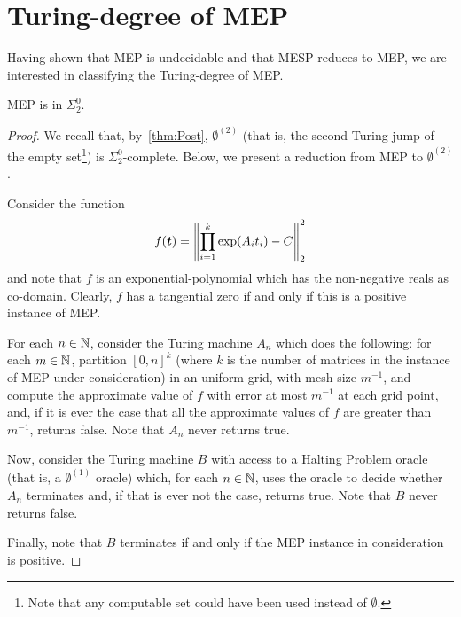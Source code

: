 \section{Turing-degree of MEP}
\label{sec:turing-degree-lics}

Having shown that MEP is undecidable and that MESP reduces to MEP, we are interested in classifying the Turing-degree of MEP.




\begin{theorem}
\label{thm:turing-degree-2}
  MEP is in $\Sigma_{2}^{0}$.
\end{theorem}

\begin{proof}
  We recall that, by~\cref{thm:Post}, $\emptyset^{(2)}$ (that is, the second Turing jump of the empty set\footnote{Note that any computable set could have been used instead of $\emptyset$.}) is $\Sigma_{2}^{0}$-complete. Below, we present a reduction from MEP to $\emptyset^{(2)}$.

  Consider the function
  \begin{equation*}
    f(\boldsymbol{t}) = \left\| \prod \limits_{i=1}^{k} \exp(A_{i} t_{i}) - C \right\|_{2}^{2}
  \end{equation*}
  and note that $f$ is an exponential-polynomial which has the non-negative reals as co-domain. Clearly, $f$ has a tangential zero if and only if this is a positive instance of MEP.

  For each $n \in \mathbb{N}$, consider the Turing machine $A_{n}$ which does the following: for each $m \in \mathbb{N}$, partition $[0,n]^{k}$ (where $k$ is the number of matrices in the instance of MEP under consideration) in an uniform grid, with mesh size $m^{-1}$, and compute the approximate value of $f$ with error at most $m^{-1}$ at each grid point, and, if it is ever the case that all the approximate values of $f$ are greater than $m^{-1}$, returns false. Note that $A_{n}$ never returns true.

  Now, consider the Turing machine $B$ with access to a Halting Problem oracle (that is, a $\emptyset^{(1)}$ oracle) which, for each $n \in \mathbb{N}$, uses the oracle to decide whether $A_{n}$ terminates and, if that is ever not the case, returns true. Note that $B$ never returns false.

  Finally, note that $B$ terminates if and only if the MEP instance in consideration is positive.
\end{proof}


